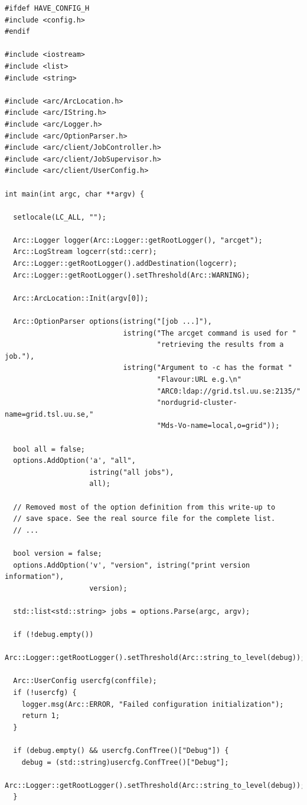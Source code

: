 \documentclass{book}
\begin{document}
\begin{shaded}
\begin{verbatim}
#ifdef HAVE_CONFIG_H
#include <config.h>
#endif

#include <iostream>
#include <list>
#include <string>

#include <arc/ArcLocation.h>
#include <arc/IString.h>
#include <arc/Logger.h>
#include <arc/OptionParser.h>
#include <arc/client/JobController.h>
#include <arc/client/JobSupervisor.h>
#include <arc/client/UserConfig.h>

int main(int argc, char **argv) {

  setlocale(LC_ALL, "");

  Arc::Logger logger(Arc::Logger::getRootLogger(), "arcget");
  Arc::LogStream logcerr(std::cerr);
  Arc::Logger::getRootLogger().addDestination(logcerr);
  Arc::Logger::getRootLogger().setThreshold(Arc::WARNING);

  Arc::ArcLocation::Init(argv[0]);

  Arc::OptionParser options(istring("[job ...]"),
                            istring("The arcget command is used for "
                                    "retrieving the results from a job."),
                            istring("Argument to -c has the format "
                                    "Flavour:URL e.g.\n"
                                    "ARC0:ldap://grid.tsl.uu.se:2135/"
                                    "nordugrid-cluster-name=grid.tsl.uu.se,"
                                    "Mds-Vo-name=local,o=grid"));

  bool all = false;
  options.AddOption('a', "all",
                    istring("all jobs"),
                    all);

  // Removed most of the option definition from this write-up to
  // save space. See the real source file for the complete list.
  // ...

  bool version = false;
  options.AddOption('v', "version", istring("print version information"),
                    version);

  std::list<std::string> jobs = options.Parse(argc, argv);

  if (!debug.empty())
    Arc::Logger::getRootLogger().setThreshold(Arc::string_to_level(debug));

  Arc::UserConfig usercfg(conffile);
  if (!usercfg) {
    logger.msg(Arc::ERROR, "Failed configuration initialization");
    return 1;
  }

  if (debug.empty() && usercfg.ConfTree()["Debug"]) {
    debug = (std::string)usercfg.ConfTree()["Debug"];
    Arc::Logger::getRootLogger().setThreshold(Arc::string_to_level(debug));
  }


\end{verbatim}
\end{shaded}
\end{document}
